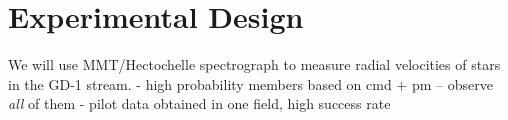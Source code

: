 \documentclass[12pt]{article}
\begin{document}
%

\pagebreak
\section*{Experimental Design}\vskip-0.2in


We will use MMT/Hectochelle spectrograph to measure radial velocities of stars in the GD-1 stream.
- high probability members based on cmd + pm -- observe \emph{all} of them
- pilot data obtained in one field, high success rate
\end{document}
